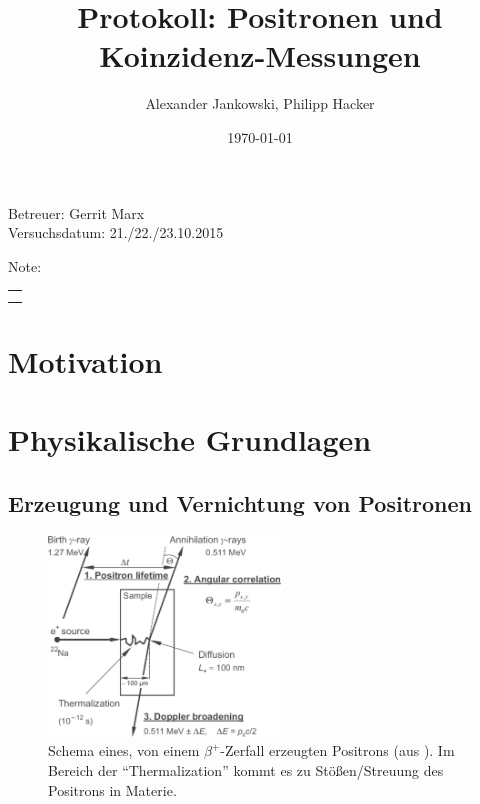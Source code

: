 \documentclass[numbers=noenddot,a4paper,notitlepage,twoside]{scrartcl}
\title{Protokoll: Positronen und Koinzidenz-Messungen} %
\author{Alexander Jankowski, Philipp Hacker}
\date{\today}
\begin{document}
	\maketitle
	\begin{center}
		Betreuer: Gerrit Marx\\ %
		Versuchsdatum: 21./22./23.10.2015\\ %
		\begin{table}[h]
			\centering
			Note: %
			\begin{tabularx}{1.5cm}{|X|}
				\hline \\ \\
				\hline
			\end{tabularx}
		\end{table}
	\end{center}
	\vspace*{\fill}
	\tableofcontents
	\vfill
	\newpage
	\section{Motivation}
	
	\newpage
	\section{Physikalische Grundlagen}

		\subsection{Erzeugung und Vernichtung von Positronen}
	
			\begin{figure}
				\includegraphics[width=0.55\textwidth,height=0.5\textwidth]{zerfallsschema.png}
				\caption{Schema eines, von einem $\beta^+$-Zerfall erzeugten Positrons (aus \cite{Augsten08}). Im Bereich der "`Thermalization"' kommt es zu Stößen/Streuung des Positrons in Materie.}
				\label{img:zerfall}
			\end{figure}
	
\end{document}
